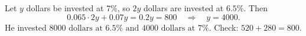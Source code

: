 Let $y$ dollars be invested at $7\%$, so $2y$ dollars are invested at $6.5\%$. Then
\[
0.065\cdot2y+0.07y=0.2y=800\quad\Longrightarrow\quad y=4000 .
\]
He invested $\boxed{8000\text{ dollars at }6.5\%\text{ and }4000\text{ dollars at }7\%}$. Check: $520+280=800$.
